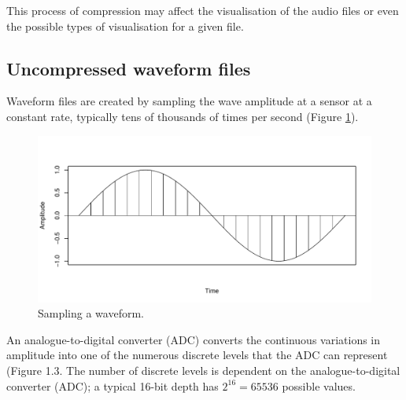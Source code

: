 \documentclass[
]{book}
\begin{document}
This process of compression may affect the visualisation of the audio files or even the possible types of visualisation for a given file.

\hypertarget{uncompressed-waveform-files}{%
\subsection{Uncompressed waveform files}\label{uncompressed-waveform-files}}

Waveform files are created by sampling the wave amplitude at a sensor at a constant rate, typically tens of thousands of times per second (Figure \ref{fig:wave-sampling}).

\begin{figure}

{\centering \includegraphics[width=0.9\linewidth]{_main_files/figure-latex/wave-sampling-1} 

}

\caption{Sampling a waveform.}\label{fig:wave-sampling}
\end{figure}

An analogue-to-digital converter (ADC) converts the continuous variations in amplitude into one of the numerous discrete levels that the ADC can represent (Figure 1.3. The number of discrete levels is dependent on the analogue-to-digital converter (ADC); a typical 16-bit depth has \(2^{16}=65536\) possible values.
\end{document}
